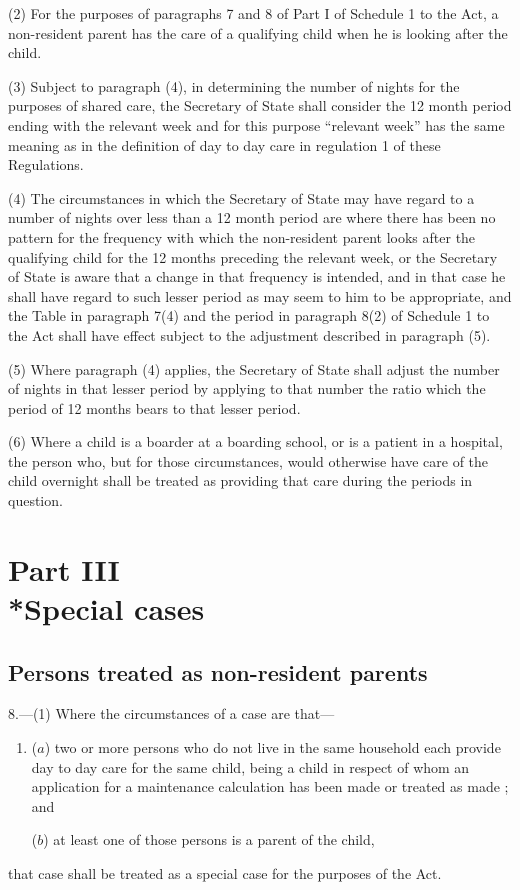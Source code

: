 \documentclass[12pt,a4paper]{article}
\begin{document}
(2) For the purposes of paragraphs 7 and 8 of Part I of Schedule 1 to the Act, a non-resident parent has the care of a qualifying child when he is looking after the child.

(3) Subject to paragraph (4), in determining the number of nights for the purposes of shared care, the Secretary of State shall consider the 12 month period ending with the relevant week and for this purpose “relevant week” has the same meaning as in the definition of day to day care in regulation 1 of these Regulations.

(4) The circumstances in which the Secretary of State may have regard to a number of nights over less than a 12 month period are where there has been no pattern for the frequency with which the non-resident parent looks after the qualifying child for the 12 months preceding the relevant week, or the Secretary of State is aware that a change in that frequency is intended, and in that case he shall have regard to such lesser period as may seem to him to be appropriate, and the Table in paragraph 7(4) and the period in paragraph 8(2) of Schedule 1 to the Act shall have effect subject to the adjustment described in paragraph (5).

(5) Where paragraph (4) applies, the Secretary of State shall adjust the number of nights in that lesser period by applying to that number the ratio which the period of 12 months bears to that lesser period.

(6) Where a child is a boarder at a boarding school, or is a patient in a hospital, the person who, but for those circumstances, would otherwise have care of the child overnight shall be treated as providing that care during the periods in question.

\section[Part III --- Special cases]{Part III\\*Special cases}

\renewcommand\parthead{--- Part III}

\subsection[8. Persons treated as non-resident parents]{Persons treated as non-resident parents}

8.---(1)  Where the circumstances of a case are that—
\begin{enumerate}\item[]
($a$) two or more persons who do not live in the same household each provide day to day care for the same 
child, being a child in respect of whom an application for a maintenance calculation has been made or treated as made%
; and

($b$) at least one of those persons is a parent of the child,
\end{enumerate}
that case shall be treated as a special case for the purposes of the Act.
\end{document}
